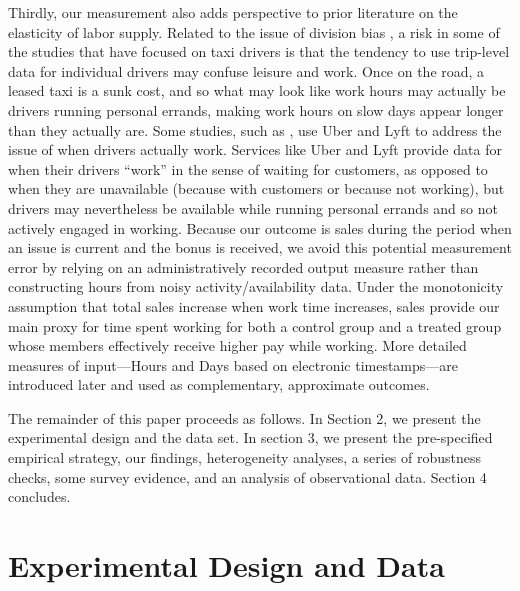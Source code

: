 \documentclass[12pt]{article}
\begin{document}
Thirdly, our measurement also adds perspective to prior literature on the elasticity of labor supply. Related to the issue of division bias \citep{borjas1980wages}, a risk in some of the studies that have focused on taxi drivers is that the tendency to use trip-level data for individual drivers may confuse leisure and work. Once on the road, a leased taxi is a sunk cost, and so what may look like work hours may actually be drivers running personal errands, making work hours on slow days appear longer than they actually are. Some studies, such as \citet{duong2023taxi}, use Uber and Lyft to address the issue of when drivers actually work. Services like Uber and Lyft provide data for when their drivers “work” in the sense of waiting for customers, as opposed to when they are unavailable (because with customers or because not working), but drivers may nevertheless be available while running personal errands and so not actively engaged in working. Because our outcome is sales during the period when an issue is current and the bonus is received, we avoid this potential measurement error by relying on an administratively recorded output measure rather than constructing hours from noisy activity/availability data. Under the monotonicity assumption that total sales increase when work time increases, sales provide our main proxy for time spent working for both a control group and a treated group whose members effectively receive higher pay while working. More detailed measures of input—Hours and Days based on electronic timestamps—are introduced later and used as complementary, approximate outcomes.

The remainder of this paper proceeds as follows. In Section 2, we present the experimental design and the data set. In section 3, we present the pre-specified empirical strategy, our findings, heterogeneity analyses, a series of robustness checks, some survey evidence, and an analysis of observational data. Section 4 concludes.


\section{Experimental Design and Data}
\end{document}
